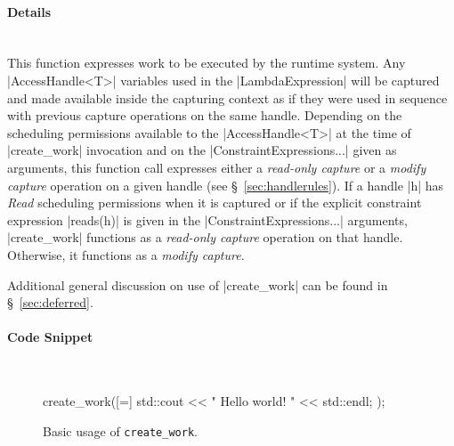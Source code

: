 \paragraph{Details}\mbox{}\\
This function expresses work to be executed by the runtime system.  Any
|AccessHandle<T>| variables used in the |LambdaExpression| will be
captured and made available inside the capturing context as if they were used in
sequence with previous capture operations on the same handle.  Depending on the
scheduling permissions available to the |AccessHandle<T>| at the time of
|create_work| invocation and on the |ConstraintExpressions...|
given as arguments, this function call expresses either a {\it read-only
capture} or a {\it modify capture} operation on a given handle (see
\S~\ref{sec:handlerules}).  If a handle |h| has {\it Read} scheduling
permissions when it is captured or if the explicit constraint expression
|reads(h)| is given in the |ConstraintExpressions...| arguments,
|create_work| functions as a {\it read-only capture} operation on that handle.
Otherwise, it functions as a {\it modify capture}.  

Additional general discussion on use of |create_work| can be found in
\S~\ref{sec:deferred}.


\paragraph{Code Snippet}\mbox{}\\
\begin{figure}[!h]
\begin{CppCodeNumb}
create_work([=]{
  std::cout << " Hello world! " << std::endl;
});
\end{CppCodeNumb}
\label{fig:fe_api_cw}
\caption{Basic usage of \texttt{create\_work}.}
\end{figure}


